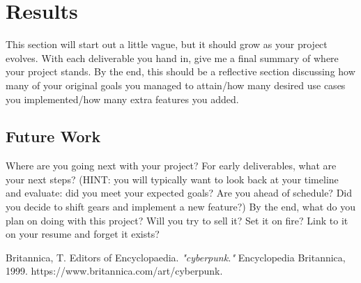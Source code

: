 \documentclass[10pt,conference,onecolumn,compsoc]{IEEEtran}
\begin{document}
\section{Results}
This section will start out a little vague, but it should grow as your project evolves.  With each deliverable you hand in, give me a final summary of where your project stands.  By the end, this should be a reflective section discussing how many of your original goals you managed to attain/how many desired use cases you implemented/how many extra features you added.

\subsection{Future Work}
Where are you going next with your project?
For early deliverables, what are your next steps?  (HINT: you will typically want to look back at your timeline and evaluate: did you meet your expected goals?  Are you ahead of schedule?  Did you decide to shift gears and implement a new feature?)
By the end, what do you plan on doing with this project?  Will you try to sell it?  Set it on fire?  Link to it on your resume and forget it exists?



\begin{thebibliography}{1}

Britannica, T. Editors of Encyclopaedia. \emph{"cyberpunk."} Encyclopedia Britannica, 		1999. https://www.britannica.com/art/cyberpunk.

\end{thebibliography}







\end{document}
